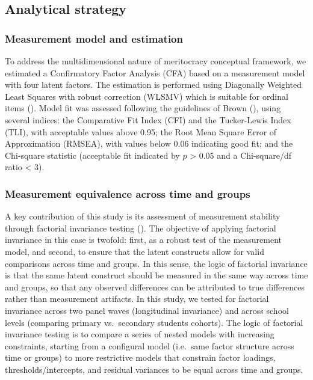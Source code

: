 \documentclass[
  13pt,
]{article}
\begin{document}
\subsection{Analytical strategy}\label{analytical-strategy}

\subsubsection{Measurement model and
estimation}\label{measurement-model-and-estimation}

To address the multidimensional nature of meritocracy conceptual
framework, we estimated a Confirmatory Factor Analysis (CFA) based on a
measurement model with four latent factors. The estimation is performed
using Diagonally Weighted Least Squares with robust correction (WLSMV)
which is suitable for ordinal items
(). Model fit was
assessed following the guidelines of Brown
(), using several indices:
the Comparative Fit Index (CFI) and the Tucker-Lewis Index (TLI), with
acceptable values above 0.95; the Root Mean Square Error of
Approximation (RMSEA), with values below 0.06 indicating good fit; and
the Chi-square statistic (acceptable fit indicated by \(p\)
\textgreater{} 0.05 and a Chi-square/df ratio \textless{} 3).

\subsubsection{Measurement equivalence across time and
groups}\label{measurement-equivalence-across-time-and-groups}

A key contribution of this study is its assessment of measurement
stability through factorial invariance testing
().
The objective of applying factorial invariance in this case is twofold:
first, as a robust test of the measurement model, and second, to ensure
that the latent constructs allow for valid comparisons across time and
groups. In this sense, the logic of factorial invariance is that the
same latent construct should be measured in the same way across time and
groups, so that any observed differences can be attributed to true
differences rather than measurement artifacts. In this study, we tested
for factorial invariance across two panel waves (longitudinal
invariance) and across school levels (comparing primary vs.~secondary
students cohorts). The logic of factorial invariance testing is to
compare a series of nested models with increasing constraints, starting
from a configural model (i.e.~same factor structure across time or
groups) to more restrictive models that constrain factor loadings,
thresholds/intercepts, and residual variances to be equal across time
and groups.
\end{document}
